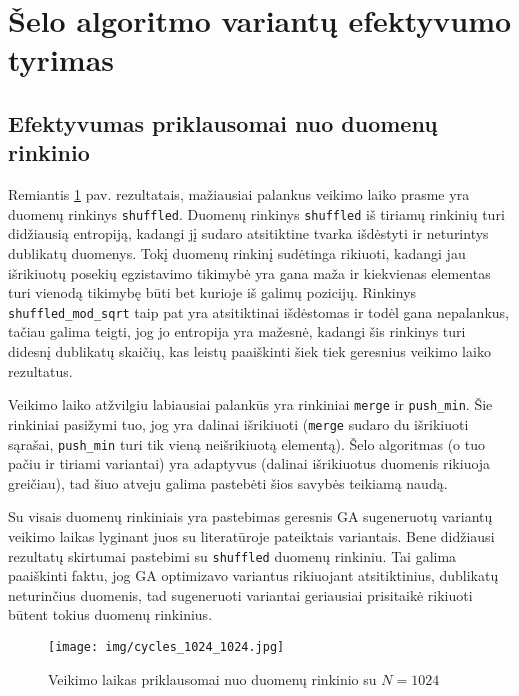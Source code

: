 \documentclass{VUMIFInfBakalaurinis}
\begin{document}
\section{Šelo algoritmo variantų efektyvumo tyrimas}

\subsection{Efektyvumas priklausomai nuo duomenų rinkinio}

Remiantis \ref{img:cycles_1024_1024} pav. rezultatais, mažiausiai palankus veikimo laiko prasme yra duomenų rinkinys \verb|shuffled|.
Duomenų rinkinys \verb|shuffled| iš tiriamų rinkinių turi didžiausią entropiją, kadangi jį sudaro atsitiktine tvarka išdėstyti ir neturintys dublikatų duomenys.
Tokį duomenų rinkinį sudėtinga rikiuoti, kadangi jau išrikiuotų posekių egzistavimo tikimybė yra gana maža ir
kiekvienas elementas turi vienodą tikimybę būti bet kurioje iš galimų pozicijų.
Rinkinys \verb|shuffled_mod_sqrt| taip pat yra atsitiktinai išdėstomas ir todėl gana nepalankus, tačiau galima teigti, jog jo entropija yra mažesnė, kadangi
šis rinkinys turi didesnį dublikatų skaičių, kas leistų paaiškinti šiek tiek geresnius veikimo laiko rezultatus.

Veikimo laiko atžvilgiu labiausiai palankūs yra rinkiniai \verb|merge| ir \verb|push_min|.
Šie rinkiniai pasižymi tuo, jog yra dalinai išrikiuoti (\verb|merge| sudaro du išrikiuoti sąrašai, \verb|push_min| turi tik vieną neišrikiuotą elementą).
Šelo algoritmas (o tuo pačiu ir tiriami variantai) yra adaptyvus (dalinai išrikiuotus duomenis rikiuoja greičiau),
tad šiuo atveju galima pastebėti šios savybės teikiamą naudą.

Su visais duomenų rinkiniais yra pastebimas geresnis GA sugeneruotų variantų veikimo laikas lyginant juos su literatūroje pateiktais variantais. 
Bene didžiausi rezultatų skirtumai pastebimi su \verb|shuffled| duomenų rinkiniu.
Tai galima paaiškinti faktu, jog GA optimizavo variantus rikiuojant atsitiktinius, dublikatų neturinčius duomenis, tad sugeneruoti variantai
geriausiai prisitaikė rikiuoti būtent tokius duomenų rinkinius.

\begin{figure}[H]
  \centering
  \texttt{[image: img/cycles\_1024\_1024.jpg]}
  \caption{Veikimo laikas priklausomai nuo duomenų rinkinio su $N = 1024$}
  \label{img:cycles_1024_1024}
\end{figure}

\pagebreak
\end{document}
